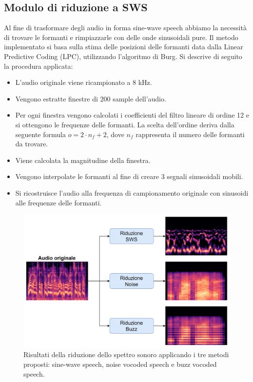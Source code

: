 			\subsection{Modulo di riduzione a SWS}
			Al fine di trasformare degli audio in forma sine-wave speech abbiamo la necessità di trovare le formanti e rimpiazzarle con delle onde sinusoidali pure. Il metodo implementato si basa sulla stima delle posizioni delle formanti data dalla Linear Predictive Coding (LPC)\cite{formants-from-lpc}, utilizzando l'algoritmo di Burg\cite{burg-algorithm}.
			Si descrive di seguito la procedura applicata:
			\begin{itemize}
				\item L'audio originale viene ricampionato a 8 kHz.
				\item Vengono estratte finestre di 200 sample dell'audio.
				\item Per ogni finestra vengono calcolati i coefficienti del filtro lineare di ordine 12 e si ottengono le frequenze delle formanti. La scelta dell'ordine deriva dalla seguente formula $ o = 2 \cdot n_{f} + 2 $, dove $ n_{f} $ rappresenta il numero delle formanti da trovare.
				\item Viene calcolata la magnitudine della finestra.
				\item Vengono interpolate le formanti al fine di creare 3 segnali sinusoidali mobili.
				\item Si ricostruisce l'audio alla frequenza di campionamento originale con sinusoidi alle frequenze delle formanti.
			\end{itemize}
			\begin{figure}
				\centering
				\includegraphics[width=0.8\linewidth]{figures/modulo-riduzione-spettro-sonoro}
				\caption{Risultati della riduzione dello spettro sonoro applicando i tre metodi proposti: sine-wave speech, noise vocoded speech e buzz vocoded speech.}
				\label{fig:modulo-riduzione-spettro-sonoro}
			\end{figure}
	
